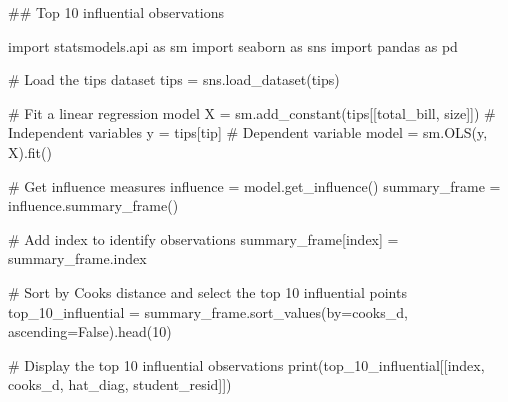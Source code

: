 \documentclass[
  letterpaper,
  DIV=11,
  numbers=noendperiod]{scrreprt}
\newenvironment{Shaded}{\begin{snugshade}}{\end{snugshade}}
\newcommand{\BuiltInTok}[1]{\textcolor[rgb]{0.00,0.23,0.31}{#1}}
\newcommand{\CommentTok}[1]{\textcolor[rgb]{0.37,0.37,0.37}{#1}}
\newcommand{\DecValTok}[1]{\textcolor[rgb]{0.68,0.00,0.00}{#1}}
\newcommand{\ImportTok}[1]{\textcolor[rgb]{0.00,0.46,0.62}{#1}}
\newcommand{\NormalTok}[1]{\textcolor[rgb]{0.00,0.23,0.31}{#1}}
\newcommand{\OperatorTok}[1]{\textcolor[rgb]{0.37,0.37,0.37}{#1}}
\newcommand{\StringTok}[1]{\textcolor[rgb]{0.13,0.47,0.30}{#1}}
\newcommand{\VariableTok}[1]{\textcolor[rgb]{0.07,0.07,0.07}{#1}}
\begin{document}
\begin{Shaded}
\begin{Highlighting}[]
\CommentTok{\#\# Top 10 influential observations }

\ImportTok{import}\NormalTok{ statsmodels.api }\ImportTok{as}\NormalTok{ sm}
\ImportTok{import}\NormalTok{ seaborn }\ImportTok{as}\NormalTok{ sns}
\ImportTok{import}\NormalTok{ pandas }\ImportTok{as}\NormalTok{ pd}

\CommentTok{\# Load the \textquotesingle{}tips\textquotesingle{} dataset}
\NormalTok{tips }\OperatorTok{=}\NormalTok{ sns.load\_dataset(}\StringTok{\textquotesingle{}tips\textquotesingle{}}\NormalTok{)}

\CommentTok{\# Fit a linear regression model}
\NormalTok{X }\OperatorTok{=}\NormalTok{ sm.add\_constant(tips[[}\StringTok{\textquotesingle{}total\_bill\textquotesingle{}}\NormalTok{, }\StringTok{\textquotesingle{}size\textquotesingle{}}\NormalTok{]])  }\CommentTok{\# Independent variables}
\NormalTok{y }\OperatorTok{=}\NormalTok{ tips[}\StringTok{\textquotesingle{}tip\textquotesingle{}}\NormalTok{]  }\CommentTok{\# Dependent variable}
\NormalTok{model }\OperatorTok{=}\NormalTok{ sm.OLS(y, X).fit()}

\CommentTok{\# Get influence measures}
\NormalTok{influence }\OperatorTok{=}\NormalTok{ model.get\_influence()}
\NormalTok{summary\_frame }\OperatorTok{=}\NormalTok{ influence.summary\_frame()}

\CommentTok{\# Add index to identify observations}
\NormalTok{summary\_frame[}\StringTok{\textquotesingle{}index\textquotesingle{}}\NormalTok{] }\OperatorTok{=}\NormalTok{ summary\_frame.index}

\CommentTok{\# Sort by Cook\textquotesingle{}s distance and select the top 10 influential points}
\NormalTok{top\_10\_influential }\OperatorTok{=}\NormalTok{ summary\_frame.sort\_values(by}\OperatorTok{=}\StringTok{\textquotesingle{}cooks\_d\textquotesingle{}}\NormalTok{, ascending}\OperatorTok{=}\VariableTok{False}\NormalTok{).head(}\DecValTok{10}\NormalTok{)}

\CommentTok{\# Display the top 10 influential observations}
\BuiltInTok{print}\NormalTok{(top\_10\_influential[[}\StringTok{\textquotesingle{}index\textquotesingle{}}\NormalTok{, }\StringTok{\textquotesingle{}cooks\_d\textquotesingle{}}\NormalTok{, }\StringTok{\textquotesingle{}hat\_diag\textquotesingle{}}\NormalTok{, }\StringTok{\textquotesingle{}student\_resid\textquotesingle{}}\NormalTok{]])}
\end{Highlighting}
\end{Shaded}
\end{document}
